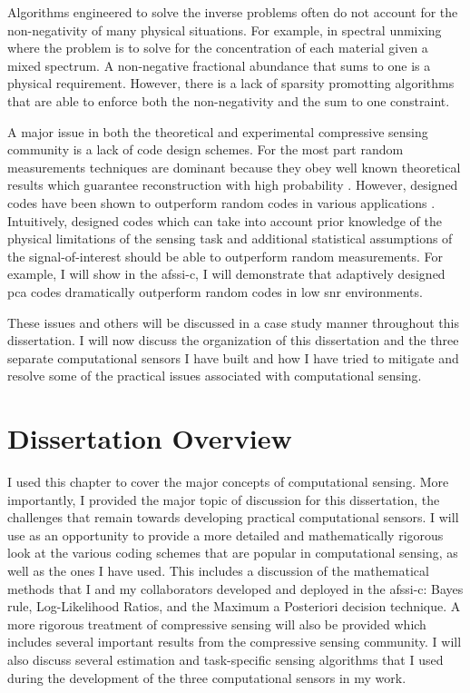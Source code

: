 Algorithms engineered to solve the inverse problems often do not account for the non-negativity of many physical situations. For example, in spectral unmixing where the problem is to solve for the concentration of each material given a mixed spectrum. A non-negative fractional abundance that sums to one is a physical requirement. However, there is a lack of sparsity promotting algorithms that are able to enforce both the non-negativity and the sum to one constraint. 

A major issue in both the theoretical and experimental compressive sensing community is a lack of code design schemes. For the most part random measurements techniques are dominant because they obey well known theoretical results which guarantee reconstruction with high probability \cite{donoho2006compressed, candes2008introduction, tropp2006just}. However, designed codes have been shown to outperform random codes in various applications \cite{dinakarababu2011adaptive, pal2005face, dunlop2016experimental, ashok2011compressive, li2014realization}. Intuitively, designed codes which can take into account prior knowledge of the physical limitations of the sensing task and additional statistical assumptions of the signal-of-interest should be able to outperform random measurements. For example, I will show in the \gls{afssi-c}, I will demonstrate that adaptively designed \gls{pca} codes dramatically outperform random codes in low \gls{snr} environments. 

These issues and others will be discussed in a case study manner throughout this dissertation. I will now discuss the organization of this dissertation and the three separate computational sensors I have built and how I have tried to mitigate and resolve some of the practical issues associated with computational sensing.

\section{Dissertation Overview}

I used this chapter to cover the major concepts of computational sensing. More importantly, I provided the major topic of discussion for this dissertation, the challenges that remain towards developing practical computational sensors. I will use  as an opportunity to provide a more detailed and mathematically rigorous look at the various coding schemes that are popular in computational sensing, as well as the ones I have used. This includes a discussion of the mathematical methods that I and my collaborators developed and deployed in the \gls{afssi-c}: Bayes rule, Log-Likelihood Ratios, and the Maximum a Posteriori decision technique. A more rigorous treatment of compressive sensing will also be provided which includes several important results from the compressive sensing community. I will also discuss several estimation and task-specific sensing algorithms that I used during the development of the three computational sensors in my work.

